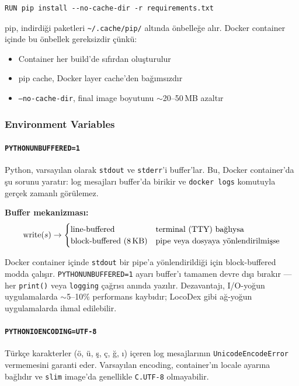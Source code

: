 \begin{verbatim}
RUN pip install --no-cache-dir -r requirements.txt
\end{verbatim}

pip, indirdi\u{g}i paketleri \texttt{\~{}/.cache/pip/} alt{\i}nda \"{o}nbelle\u{g}e al{\i}r. Docker container i\c{c}inde bu \"{o}nbellek gereksizdir \c{c}\"{u}nk\"{u}:
\begin{itemize}
  \item Container her build'de s{\i}f{\i}rdan olu\c{s}turulur
  \item pip cache, Docker layer cache'den ba\u{g}{\i}ms{\i}zd{\i}r
  \item \texttt{--no-cache-dir}, final image boyutunu $\sim$20--50\,MB azalt{\i}r
\end{itemize}

\subsubsection{Environment Variables}

\paragraph{\texttt{PYTHONUNBUFFERED=1}} Python, varsay{\i}lan olarak \texttt{stdout} ve \texttt{stderr}'i buffer'lar. Bu, Docker container'da \c{s}u sorunu yarat{\i}r: log mesajlar{\i} buffer'da birikir ve \texttt{docker logs} komutuyla ger\c{c}ek zamanl{\i} g\"{o}r\"{u}lemez.

\textbf{Buffer mekanizmas{\i}:}
\begin{equation}
\text{write}(s) \to
\begin{cases}
\text{line-buffered} & \text{terminal (TTY) ba\u{g}l{\i}ysa} \\
\text{block-buffered (8\,KB)} & \text{pipe veya dosyaya y\"{o}nlendirilmi\c{s}se}
\end{cases}
\end{equation}

Docker container i\c{c}inde \texttt{stdout} bir pipe'a y\"{o}nlendirildi\u{g}i i\c{c}in block-buffered modda \c{c}al{\i}\c{s}{\i}r. \texttt{PYTHONUNBUFFERED=1} ayar{\i} buffer'{\i} tamamen devre d{\i}\c{s}{\i} b{\i}rak{\i}r --- her \texttt{print()} veya \texttt{logging} \c{c}a\u{g}r{\i}s{\i} an{\i}nda yaz{\i}l{\i}r. Dezavantaj{\i}, I/O-yo\u{g}un uygulamalarda $\sim$5--10\% performans kayb{\i}d{\i}r; LocoDex gibi a\u{g}-yo\u{g}un uygulamalarda ihmal edilebilir.

\paragraph{\texttt{PYTHONIOENCODING=UTF-8}} T\"{u}rk\c{c}e karakterler (\"{o}, \"{u}, \c{s}, \c{c}, \u{g}, {\i}) i\c{c}eren log mesajlar{\i}n{\i}n \texttt{UnicodeEncodeError} vermemesini garanti eder. Varsay{\i}lan encoding, container'{\i}n locale ayar{\i}na ba\u{g}l{\i}d{\i}r ve \texttt{slim} image'da genellikle \texttt{C.UTF-8} olmayabilir.

